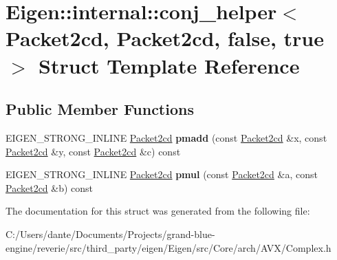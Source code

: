 \hypertarget{struct_eigen_1_1internal_1_1conj__helper_3_01_packet2cd_00_01_packet2cd_00_01false_00_01true_01_4}{}\section{Eigen\+::internal\+::conj\+\_\+helper$<$ Packet2cd, Packet2cd, false, true $>$ Struct Template Reference}
\label{struct_eigen_1_1internal_1_1conj__helper_3_01_packet2cd_00_01_packet2cd_00_01false_00_01true_01_4}
\subsection*{Public Member Functions}
\begin{DoxyCompactItemize}
\item 
\mbox{\label{struct_eigen_1_1internal_1_1conj__helper_3_01_packet2cd_00_01_packet2cd_00_01false_00_01true_01_4_ade4bdd34fc1f6e68d7b988778b5574bf}} 
E\+I\+G\+E\+N\+\_\+\+S\+T\+R\+O\+N\+G\+\_\+\+I\+N\+L\+I\+NE \mbox{\hyperlink{struct_eigen_1_1internal_1_1_packet2cd}{Packet2cd}} {\bfseries pmadd} (const \mbox{\hyperlink{struct_eigen_1_1internal_1_1_packet2cd}{Packet2cd}} \&x, const \mbox{\hyperlink{struct_eigen_1_1internal_1_1_packet2cd}{Packet2cd}} \&y, const \mbox{\hyperlink{struct_eigen_1_1internal_1_1_packet2cd}{Packet2cd}} \&c) const
\item 
\mbox{\label{struct_eigen_1_1internal_1_1conj__helper_3_01_packet2cd_00_01_packet2cd_00_01false_00_01true_01_4_a7467ccb1243cb2f7cbcd143fecb9824e}} 
E\+I\+G\+E\+N\+\_\+\+S\+T\+R\+O\+N\+G\+\_\+\+I\+N\+L\+I\+NE \mbox{\hyperlink{struct_eigen_1_1internal_1_1_packet2cd}{Packet2cd}} {\bfseries pmul} (const \mbox{\hyperlink{struct_eigen_1_1internal_1_1_packet2cd}{Packet2cd}} \&a, const \mbox{\hyperlink{struct_eigen_1_1internal_1_1_packet2cd}{Packet2cd}} \&b) const
\end{DoxyCompactItemize}


The documentation for this struct was generated from the following file\+:\begin{DoxyCompactItemize}
\item 
C\+:/\+Users/dante/\+Documents/\+Projects/grand-\/blue-\/engine/reverie/src/third\+\_\+party/eigen/\+Eigen/src/\+Core/arch/\+A\+V\+X/Complex.\+h\end{DoxyCompactItemize}
